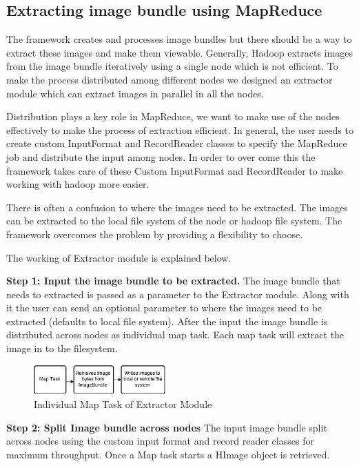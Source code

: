 \documentclass[conference]{IEEEtran}
\begin{document}
\subsection{Extracting image bundle using MapReduce}
The framework creates and processes image bundles but there should be a way to extract these images and make them viewable. Generally, Hadoop extracts images from the image bundle iteratively using a single node which is not efficient. To make the process distributed among different nodes we designed an extractor module which can extract images in parallel in all the nodes. 

Distribution plays a key role in MapReduce, we want to make use of the nodes effectively to make the process of extraction efficient. In general, the user needs to create custom InputFormat and RecordReader classes to specify the MapReduce job and distribute the input among nodes. In order to over come this the framework takes care of these Custom InputFormat and RecordReader to make working with hadoop more easier.

There is often a confusion to where the images need to be extracted. The images can be extracted to the local file system of the node or hadoop file system. The framework overcomes the problem by providing a flexibility to choose.
 
The working of Extractor module is explained below.

\textbf{Step 1: Input the image bundle to be extracted.} The image bundle that needs to extracted is passed as a parameter to the Extractor module. Along with it the user can send an optional parameter to where the images need to be extracted (defaults to local file system). After the input the image bundle is distributed across nodes as individual map task. Each map task will extract the image in to the filesystem.     

\begin{figure}[h]
	\centering
	\includegraphics[width=0.45\textwidth]{ext-map}
	\caption{Individual Map Task of Extractor Module}
	\label{fig:ext-map}
\end{figure}


\textbf{Step 2: Split Image bundle across nodes}
The input image bundle split across nodes using the custom input format and record reader classes for maximum throughput. Once a Map task starts a HImage object is retrieved.
\end{document}
